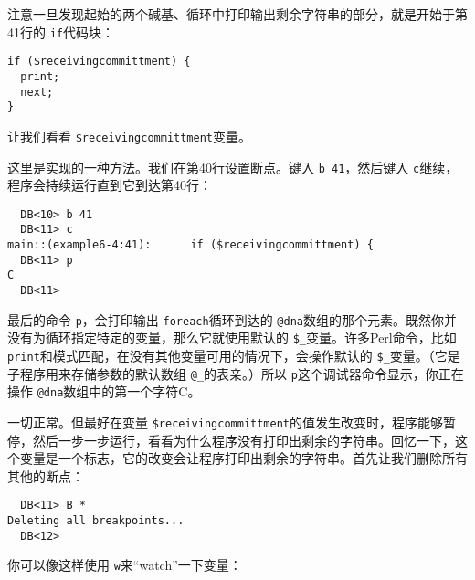 注意一旦发现起始的两个碱基、循环中打印输出剩余字符串的部分，就是开始于第41行的 \verb|if|代码块：

\begin{lstlisting}
if ($receivingcommittment) {
  print;
  next;
}
\end{lstlisting}

让我们看看 \verb|$receivingcommittment|变量。

这里是实现的一种方法。我们在第40行设置断点。键入 \verb|b 41|，然后键入 \verb|c|继续，程序会持续运行直到它到达第40行：

\begin{lstlisting}
  DB<10> b 41
  DB<11> c
main::(example6-4:41):      if ($receivingcommittment) {
  DB<11> p
C
  DB<11> 
\end{lstlisting}

最后的命令 \verb|p|，会打印输出 \verb|foreach|循环到达的 \verb|@dna|数组的那个元素。既然你并没有为循环指定特定的变量，那么它就使用默认的 \verb|$_|变量。许多Perl命令，比如 \verb|print|和模式匹配，在没有其他变量可用的情况下，会操作默认的 \verb|$_|变量。（它是子程序用来存储参数的默认数组 \verb|@_|的表亲。）所以 \verb|p|这个调试器命令显示，你正在操作 \verb|@dna|数组中的第一个字符C。

一切正常。但最好在变量 \verb|$receivingcommittment|的值发生改变时，程序能够暂停，然后一步一步运行，看看为什么程序没有打印出剩余的字符串。回忆一下，这个变量是一个标志，它的改变会让程序打印出剩余的字符串。首先让我们删除所有其他的断点：

\begin{lstlisting}
  DB<11> B *
Deleting all breakpoints...
  DB<12> 
\end{lstlisting}

你可以像这样使用 \verb|w|来“watch”一下变量：

